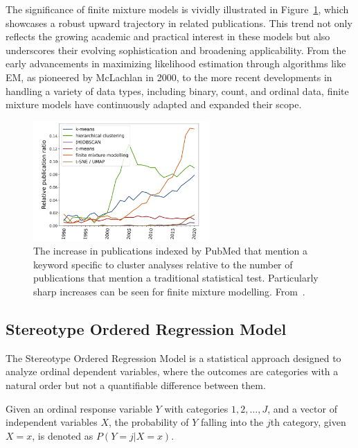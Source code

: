 \documentclass{article}
\begin{document}
The significance of finite mixture models is vividly illustrated in Figure~\ref{fig:trend}, which showcases a robust upward trajectory in related publications. This trend not only reflects the growing academic and practical interest in these models but also underscores their evolving sophistication and broadening applicability. From the early advancements in maximizing likelihood estimation through algorithms like EM, as pioneered by McLachlan in 2000, to the more recent developments in handling a variety of data types, including binary, count, and ordinal data, finite mixture models have continuously adapted and expanded their scope.

\begin{figure}[ht!] %
    \centering %
    \includegraphics[width=0.6\textwidth]{images/trend.png} %
    \caption{The increase in publications indexed by PubMed that mention a keyword specific to cluster analyses relative to the number of publications 
    that mention a traditional statistical test. 
    Particularly sharp increases can be seen for finite mixture modelling.
    From~\cite{dalmaijer2022statistical}.} %
    \label{fig:trend} %
  \end{figure}

\subsection{Stereotype Ordered Regression Model}

The Stereotype Ordered Regression Model is a statistical approach designed to analyze ordinal dependent variables, where the outcomes are categories with a natural order but not a quantifiable difference between them.

Given an ordinal response variable $Y$ with categories $1, 2, \ldots, J$, and a vector of independent variables $X$, the probability of $Y$ falling into the $j$th category, given $X = x$, is denoted as $P(Y = j | X = x)$.
\end{document}
